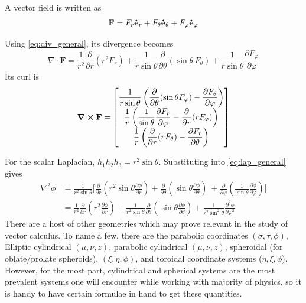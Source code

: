 			A vector field is written as
			\[
				\vb{F} = F_r\vu{e}_r + F_\theta \vu{e}_\theta + F_\varphi \vu{e}_\varphi
			\]

			Using \eqref{eq:div_general}, its divergence becomes
			\begin{equation}
				\nabla\cdot\mathbf F
				=
				\frac{1}{r^2}
				\frac{\partial}{\partial r}(r^2F_r)
				+
				\frac{1}{r\sin\theta}
				\frac{\partial}{\partial\theta}
				(\sin\theta\,F_\theta)
				+
				\frac{1}{r\sin\theta}
				\frac{\partial F_\varphi}{\partial\varphi}
			\end{equation}
			Its curl is
			\begin{equation}
				\curl\vb{F} =
				\mqty[
					\dfrac{1}{r\sin\theta}
					\left(
					\dfrac{\partial}{\partial\theta}
					(\sin\theta F_\varphi)
					-
					\dfrac{\partial F_\theta}{\partial\varphi}
					\right)\\
					\dfrac{1}{r}
					\left(
					\dfrac{1}{\sin\theta}
					\dfrac{\partial F_r}{\partial\varphi}
					-
					\dfrac{\partial}{\partial r}(rF_\varphi)
					\right)\\
					\dfrac{1}{r}
					\left(
					\dfrac{\partial}{\partial r}(rF_\theta)
					-
					\dfrac{\partial F_r}{\partial\theta}
					\right)
				]
			\end{equation}

			For the scalar Laplacian, $h_1h_2h_3=r^2\sin\theta$. Substituting into \eqref{eq:lap_general} gives
			\begin{align*}
				\nabla^2\phi
				&=
				\frac{1}{r^2\sin\theta}
				\Bigg[
				\frac{\partial}{\partial r}
				\left(
				r^2\sin\theta
				\frac{\partial\phi}{\partial r}
				\right)
				+
				\frac{\partial}{\partial\theta}
				\left(
				\sin\theta
				\frac{\partial\phi}{\partial\theta}
				\right)\
				+
				\frac{\partial}{\partial\varphi}
				\left(
				\frac{1}{\sin\theta}
				\frac{\partial\phi}{\partial\varphi}
				\right)
				\Bigg]\\[4pt]
				&=
				\frac{1}{r^2}
				\frac{\partial}{\partial r}
				\left(
				r^2\frac{\partial\phi}{\partial r}
				\right)
				+
				\frac{1}{r^2\sin\theta}
				\frac{\partial}{\partial\theta}
				\left(
				\sin\theta\frac{\partial\phi}{\partial\theta}
				\right)
				+
				\frac{1}{r^2\sin^2\theta}
				\frac{\partial^2\phi}{\partial\varphi^2}
			\end{align*}
			There are a host of other geometries which may prove relevant
			in the study of vector calculus. To name a few, there are the 
			parabolic coordinates $(\sigma,\tau,\phi)$, Elliptic cylindrical $(\mu,\nu,z)$,
			parabolic cylindrical $(\mu,\nu,z)$, spheroidal (for oblate/prolate spheroids), $(\xi,\eta,\phi)$,
			and toroidal coordinate systems ($\eta,\xi,\phi$). However, for the most part, cylindrical
			and spherical systems are the most prevalent systems one will encounter while working
			with majority of physics, so it is handy to have certain formulae in hand 
			to get these quantities. 

